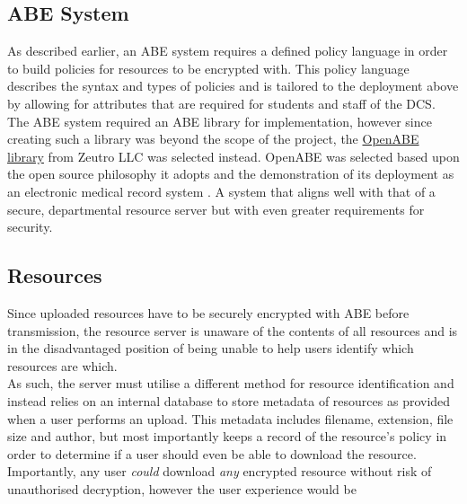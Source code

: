 \subsection{ABE System}
\label{subsec:design_abe_sys}

As described earlier, an ABE system requires a defined policy language in order to build policies for resources to be encrypted with. This policy language describes the syntax and types of policies and is tailored to the deployment above by allowing for attributes that are required for students and staff of the DCS.\\
The ABE system required an ABE library for implementation, however since creating such a library was beyond the scope of the project, the \href{https://github.com/zeutro/openabe}{OpenABE library} from Zeutro LLC was selected instead. OpenABE was selected based upon the open source philosophy it adopts and the demonstration of its deployment as an electronic medical record system \citet{Akinyele2011}. A system that aligns well with that of a secure, departmental resource server but with even greater requirements for security.

\subsection{Resources}
\label{subsec:design_resources}

Since uploaded resources have to be securely encrypted with ABE before transmission, the resource server is unaware of the contents of all resources and is in the disadvantaged position of being unable to help users identify which resources are which.\\
As such, the server must utilise a different method for resource identification and instead relies on an internal database to store metadata of resources as provided when a user performs an upload. This metadata includes filename, extension, file size and author, but most importantly keeps a record of the resource's policy in order to determine if a user should even be able to download the resource.\\
Importantly, any user \textit{could} download \textit{any} encrypted resource without risk of unauthorised decryption, however the user experience would be
